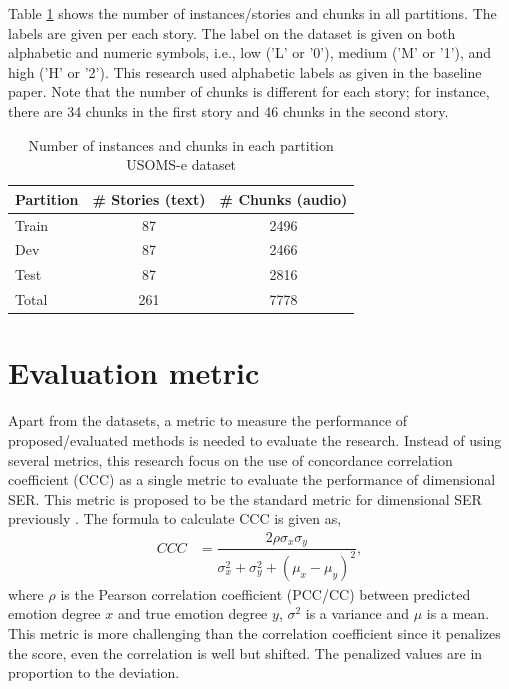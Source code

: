 {Table \ref{tab:dataset} shows the number of instances/stories and chunks in all
partitions. The labels are given per each story. The label on the dataset is
given on both alphabetic and numeric symbols, i.e., low ('L' or '0'), medium
('M' or '1'), and high ('H' or '2'). This research used alphabetic labels as
given in the baseline paper. Note that the number of chunks is different for
each story; for instance, there are 34 chunks in the first story and 46 chunks
in the second story.

\begin{table}[t]
  \caption{Number of instances and chunks in each partition USOMS-e dataset}
  \label{tab:dataset}
  \centering
  \begin{tabular}{ l c c }
    \hline
Partition & \# Stories (text) & \# Chunks (audio) \\
\hline \hline
Train     & 87                & 2496  \\
Dev       & 87                & 2466  \\
Test      & 87                & 2816  \\
    \hline
Total     & 261               & 7778 \\
    \hline
  \end{tabular}
  \end{table}


\section{Evaluation metric}
Apart from the datasets, a metric to measure the performance of
proposed/evaluated methods is needed to evaluate the research. Instead of using
several metrics, this research focus on the use of concordance correlation
coefficient (CCC) as a single metric to evaluate the performance of dimensional
SER.  This metric is proposed to be the standard metric for dimensional SER
previously \cite{Ringeval2015a}. The formula to calculate CCC is given as, 
\begin{align} 
  CCC &= \dfrac{2 \rho \sigma_x \sigma_y} {\sigma_x^2 + \sigma_y^2 + (\mu_x - \mu_y)^2},
\end{align}
where $\rho$ is the Pearson correlation coefficient (PCC/CC) between predicted
emotion degree $x$ and true emotion degree $y$, $\sigma^2$ is a variance and
$\mu$ is a mean. This metric is more challenging than the correlation
coefficient since it penalizes the score, even the correlation is well but
shifted.  The penalized values are in proportion to the deviation.

}
